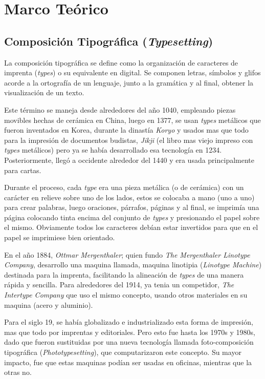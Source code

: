 \documentclass[12pt,letterpaper,titlepage,oneside,openright]{book}
\begin{document}
\chapter{Marco Teórico}
\section{Composición Tipográfica (\textit{Typesetting})}

La composición tipográfica se define como la organización de caracteres de imprenta (\textit{types}) o su equivalente en digital. Se componen letras, símbolos y glifos acorde a la ortografía de un lenguaje, junto a la gramática y al final, obtener la visualización de un texto.

Este término se maneja desde alrededores del año 1040, empleando piezas movibles hechas de cerámica en China, luego en 1377, se usan \textit{types} metálicos que fueron inventados en Korea, durante la dinastía \textit{Koryo} y usados mas que todo para la impresión de documentos budistas, \textit{Jikji} (el libro mas viejo impreso con \textit{types} metálicos) pero ya se había desarrollado esa tecnología en 1234. Posteriormente, llegó a occidente alrededor del 1440 y era usada principalmente para cartas.

Durante el proceso, cada \textit{type} era una pieza metálica (o de cerámica) con un carácter en relieve sobre uno de los lados, estos se colocaba a mano (uno a uno) para crear palabras, luego oraciones, párrafos, páginas y al final, se imprimía una página colocando tinta encima del conjunto de \textit{types} y presionando el papel sobre el mismo. Obviamente todos los caracteres debían estar invertidos para que en el papel se imprimiese bien orientado.

En el año 1884, \textit{Ottmar Mergenthaler}; quien fundo \textit{The Mergenthaler Linotype Company}, desarrollo una maquina llamada, maquina linotipia (\textit{Linotype Machine}) destinada para la imprenta, facilitando la alineación de \textit{types} de una manera rápida y sencilla. Para alrededores del 1914, ya tenia un competidor, \textit{The Intertype Company} que uso el mismo concepto, usando otros materiales en su maquina (acero y aluminio).

Para el siglo 19, se había globalizado e industrializado esta forma de impresión, mas que todo por imprentas y editoriales. Pero esto fue hasta los 1970s y 1980s, dado que fueron sustituidas por una nueva tecnología llamada foto-composición tipográfica (\textit{Phototypesetting}), que computarizaron este concepto. Su mayor impacto, fue que estas maquinas podían ser usadas en oficinas, mientras que la otras no.
\end{document}
